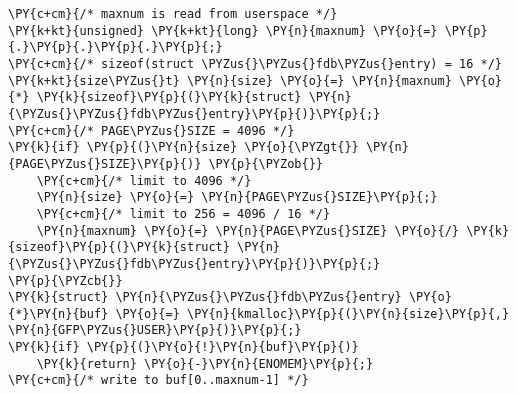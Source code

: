 \begin{Verbatim}[commandchars=\\\{\},codes={\catcode`\$=3\catcode`\^=7\catcode`\_=8}]
\PY{c+cm}{/* maxnum is read from userspace */}
\PY{k+kt}{unsigned} \PY{k+kt}{long} \PY{n}{maxnum} \PY{o}{=} \PY{p}{.}\PY{p}{.}\PY{p}{.}\PY{p}{;}
\PY{c+cm}{/* sizeof(struct \PYZus{}\PYZus{}fdb\PYZus{}entry) = 16 */}
\PY{k+kt}{size\PYZus{}t} \PY{n}{size} \PY{o}{=} \PY{n}{maxnum} \PY{o}{*} \PY{k}{sizeof}\PY{p}{(}\PY{k}{struct} \PY{n}{\PYZus{}\PYZus{}fdb\PYZus{}entry}\PY{p}{)}\PY{p}{;}
\PY{c+cm}{/* PAGE\PYZus{}SIZE = 4096 */}
\PY{k}{if} \PY{p}{(}\PY{n}{size} \PY{o}{\PYZgt{}} \PY{n}{PAGE\PYZus{}SIZE}\PY{p}{)} \PY{p}{\PYZob{}}
    \PY{c+cm}{/* limit to 4096 */}
    \PY{n}{size} \PY{o}{=} \PY{n}{PAGE\PYZus{}SIZE}\PY{p}{;}
    \PY{c+cm}{/* limit to 256 = 4096 / 16 */}
    \PY{n}{maxnum} \PY{o}{=} \PY{n}{PAGE\PYZus{}SIZE} \PY{o}{/} \PY{k}{sizeof}\PY{p}{(}\PY{k}{struct} \PY{n}{\PYZus{}\PYZus{}fdb\PYZus{}entry}\PY{p}{)}\PY{p}{;}
\PY{p}{\PYZcb{}}
\PY{k}{struct} \PY{n}{\PYZus{}\PYZus{}fdb\PYZus{}entry} \PY{o}{*}\PY{n}{buf} \PY{o}{=} \PY{n}{kmalloc}\PY{p}{(}\PY{n}{size}\PY{p}{,} \PY{n}{GFP\PYZus{}USER}\PY{p}{)}\PY{p}{;}
\PY{k}{if} \PY{p}{(}\PY{o}{!}\PY{n}{buf}\PY{p}{)}
    \PY{k}{return} \PY{o}{-}\PY{n}{ENOMEM}\PY{p}{;}
\PY{c+cm}{/* write to buf[0..maxnum-1] */}
\end{Verbatim}
